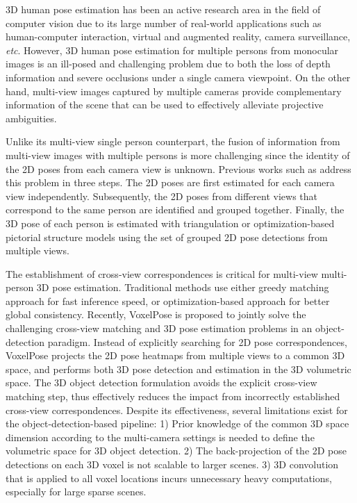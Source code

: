 \documentclass[final]{cvpr}
\begin{document}
3D human pose estimation has been an active research area in the field of computer vision due to its large number of real-world applications such as human-computer interaction, virtual and augmented reality, camera surveillance, \textit{etc}. However, 3D human pose estimation for multiple persons from monocular images is an ill-posed and challenging problem due to both the loss of depth information and severe occlusions under a single camera viewpoint.
On the other hand, multi-view images captured by multiple cameras provide complementary information of the scene that can be used to effectively alleviate projective
ambiguities.

Unlike its multi-view single person \cite{qiu2019cross,iskakov2019learnable,remelli2020lightweight,iqbal2020weakly,xie2020metafuse} counterpart, the fusion of information from multi-view images with multiple persons is more challenging since the identity of the 2D poses from each camera view is unknown.
Previous works such as \cite{dong2019fast,chen2020multi,huang2020end} address this problem in three steps. The 2D poses are first estimated for each camera view independently.
Subsequently, the 2D poses from different views that correspond to the same person are identified and grouped together.
Finally, the 3D pose of each person is estimated  
with triangulation or optimization-based pictorial structure models
using the set of grouped 2D pose detections from multiple views. 

The establishment of cross-view correspondences is critical for multi-view multi-person 3D pose estimation.
Traditional methods use either greedy matching approach \cite{huang2020end} for fast inference speed, or optimization-based approach \cite{dong2019fast,ershadi2018multiple,chen2020multi} for better global consistency.
Recently, VoxelPose \cite{tu2020voxelpose} is proposed to jointly solve the challenging cross-view matching and 3D pose estimation problems in an object-detection paradigm.
Instead of explicitly searching for 2D pose correspondences, VoxelPose projects the 2D pose heatmaps from multiple views to a common 3D space, and performs both 3D pose detection and estimation in the 3D volumetric space.
The 3D object detection formulation avoids the explicit cross-view matching step, thus effectively reduces the impact from incorrectly established cross-view correspondences.
Despite its effectiveness, several limitations exist for the object-detection-based pipeline:
1) Prior knowledge of the common 3D space dimension according to the multi-camera settings is needed to define the volumetric space for 3D object detection.
2) The back-projection of the 2D pose detections on
each 3D voxel is not scalable to larger scenes.
3) 3D convolution that is applied to all voxel locations incurs unnecessary heavy computations, especially for large sparse scenes.
\end{document}
